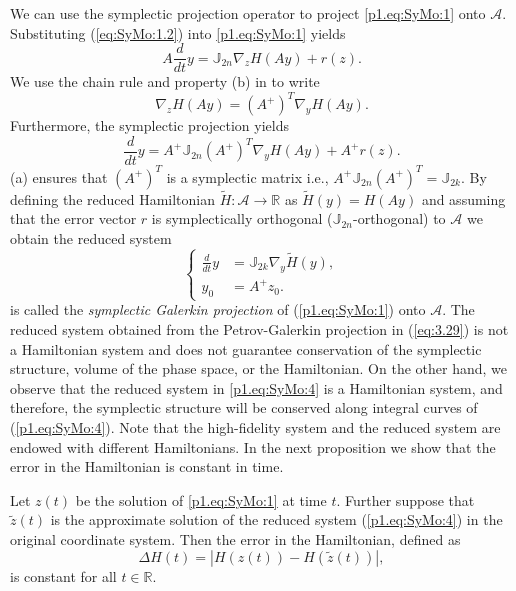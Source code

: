 We can use the symplectic projection operator to project \eqref{p1.eq:SyMo:1} onto $\mathcal A$. Substituting (\ref{eq:SyMo:1.2}) into \eqref{p1.eq:SyMo:1} yields
\begin{equation} \label{p1.eq:SyMo:2}
	A \frac d {dt}y = \mathbb{J}_{2n} \nabla_{z} H(A y) + r(z). 
\end{equation}
We use the chain rule and property (b) in  to write 
\begin{equation}
	\nabla_{z} H(A y) = (A^+)^T \nabla_{y} H( Ay ).
\end{equation}
 Furthermore, the symplectic projection yields
\begin{equation} \label{p1.eq:SyMo:3}
	\frac d {dt} y = A^+ \mathbb J_{2n} (A^+)^T \nabla_{y} H(A y) + A^+ r(z).
\end{equation}
 (a) ensures that $(A^+)^T$ is a symplectic matrix i.e., $A^+ \mathbb J_{2n} (A^+)^T = \mathbb{J}_{2k}$. By defining the reduced Hamiltonian $\tilde H:\mathcal A \to \mathbb R$ as $\tilde H (y) = H(Ay)$ and assuming that the error vector $r$ is symplectically orthogonal ($\mathbb J_{2n}$-orthogonal) to $\mathcal A$ we obtain the reduced system
\begin{equation} \label{p1.eq:SyMo:4}
\left\{
\begin{aligned}
	 \frac{d}{dt} y &= \mathbb J_{2k} \nabla_{y} \tilde H(y), \\
	 y_0 &= A^+ z_0.
\end{aligned}
\right.
\end{equation}
 is called the \emph{symplectic Galerkin projection} of (\ref{p1.eq:SyMo:1}) onto $\mathcal A$. The reduced system obtained from the Petrov-Galerkin projection in (\ref{eq:3.29}) is not a Hamiltonian system and does not guarantee conservation of the symplectic structure, volume of the phase space, or the Hamiltonian. On the other hand, we observe that the reduced system in \eqref{p1.eq:SyMo:4} is a Hamiltonian system, and therefore, the symplectic structure will be conserved along integral curves of (\ref{p1.eq:SyMo:4}). Note that the high-fidelity system and the reduced system are endowed with different Hamiltonians. In the next proposition we show that the error in the Hamiltonian is constant in time. 


\begin{proposition} \label{p1.theorem:2}
Let ${z} (t)$ be the solution of \eqref{p1.eq:SyMo:1} at time $t$. Further suppose that $\tilde{{z}} (t)$ is the approximate solution of the reduced system (\ref{p1.eq:SyMo:4}) in the original coordinate system. Then the error in the Hamiltonian, defined as
\begin{equation} \label{p1.eq:SyMo:5}
	\Delta H(t)  = |H(z(t)) - H(\tilde{z}(t))|,
\end{equation}
is constant for all $t\in \mathbb R$.
\end{proposition}

